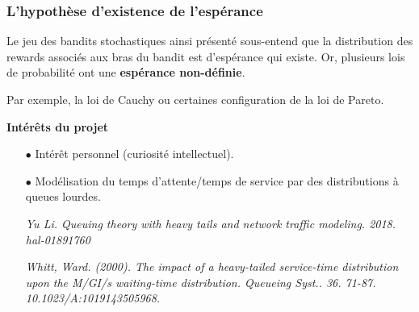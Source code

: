 \documentclass[8pt, sans]{beamer}
\begin{document}
\begin{frame}
\frametitle{L'hypothèse d'existence de l'espérance}
Le jeu des bandits stochastiques ainsi présenté sous-entend que la distribution des rewards associés aux bras du bandit est d'espérance qui existe. Or, plusieurs lois de probabilité ont une \textbf{espérance non-définie}. 

\pause
\vfill

Par exemple, la loi de Cauchy ou certaines configuration de la loi de Pareto.

\pause
\vfill

\textbf{Intérêts du projet}


\begin{itemize}
\item[$\bullet$]
Intérêt personnel (curiosité intellectuel).

\pause
\vfill

\item[$\bullet$]
Modélisation du temps d'attente/temps de service par des distributions à queues lourdes.

\pause
\vfill

{\it Yu Li. Queuing theory with heavy tails and network traffic modeling. 2018. hal-01891760}

\vfill

{\it Whitt, Ward. (2000). The impact of a heavy-tailed service-time distribution upon the M/GI/s waiting-time distribution. Queueing Syst.. 36. 71-87. 10.1023/A:1019143505968.}

\end{itemize}

\vfill

\end{frame}
\end{document}
